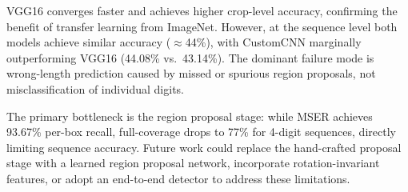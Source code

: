 \documentclass[10pt,twocolumn]{article}
\begin{document}
VGG16 converges faster and achieves higher crop-level accuracy, confirming
the benefit of transfer learning from ImageNet.
However, at the sequence level both models achieve similar accuracy
($\approx$44\%), with CustomCNN marginally outperforming VGG16 (44.08\%
vs.\ 43.14\%).
The dominant failure mode is wrong-length prediction caused by missed or
spurious region proposals, not misclassification of individual digits.

The primary bottleneck is the region proposal stage: while MSER achieves
93.67\% per-box recall, full-coverage drops to 77\% for 4-digit sequences,
directly limiting sequence accuracy.
Future work could replace the hand-crafted proposal stage with a learned
region proposal network, incorporate rotation-invariant features, or adopt
an end-to-end detector to address these limitations.



\end{document}
